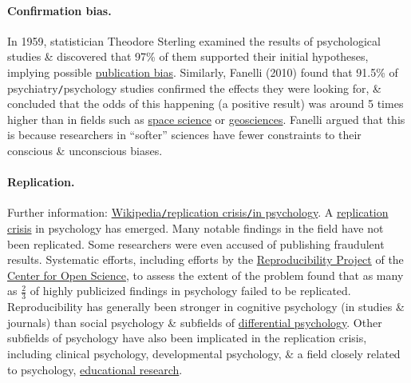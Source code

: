 \documentclass[oneside]{book}
\numberwithin{equation}{section}
\begin{document}
\paragraph{Confirmation bias.} In 1959, statistician Theodore Sterling examined the results of psychological studies \& discovered that 97\% of them supported their initial hypotheses, implying possible \href{https://en.wikipedia.org/wiki/Publication_bias}{publication bias}. Similarly, Fanelli (2010) found that 91.5\% of psychiatry\texttt{/}psychology studies confirmed the effects they were looking for, \& concluded that the odds of this happening (a positive result) was around 5 times higher than in fields such as \href{https://en.wikipedia.org/wiki/Space_science}{space science} or \href{https://en.wikipedia.org/wiki/Geoscience}{geosciences}. Fanelli argued that this is because researchers in ``softer'' sciences have fewer constraints to their conscious \& unconscious biases.

\paragraph{Replication.} Further information: \href{https://en.wikipedia.org/wiki/Replication_crisis#In_psychology}{Wikipedia\texttt{/}replication crisis\texttt{/}in psychology}. A \href{https://en.wikipedia.org/wiki/Replication_crisis}{replication crisis} in psychology has emerged. Many notable findings in the field have not been replicated. Some researchers were even accused of publishing fraudulent results. Systematic efforts, including efforts by the \href{https://en.wikipedia.org/wiki/Reproducibility_Project}{Reproducibility Project} of the \href{https://en.wikipedia.org/wiki/Center_for_Open_Science}{Center for Open Science}, to assess the extent of the problem found that as many as $\frac{2}{3}$ of highly publicized findings in psychology failed to be replicated. Reproducibility has generally been stronger in cognitive psychology (in studies \& journals) than social psychology \& subfields of \href{https://en.wikipedia.org/wiki/Differential_psychology}{differential psychology}. Other subfields of psychology have also been implicated in the replication crisis, including clinical psychology, developmental psychology, \& a field closely related to psychology, \href{https://en.wikipedia.org/wiki/Educational_research}{educational research}.
\end{document}
